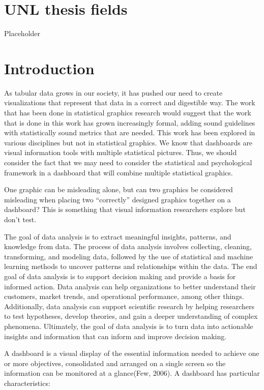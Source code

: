 \documentclass[print]{nuthesis}
\begin{document}
\hypertarget{unl-thesis-fields}{%
\chapter{UNL thesis fields}\label{unl-thesis-fields}}

Placeholder

\hypertarget{introduction}{%
\chapter{Introduction}\label{introduction}}

As tabular data grows in our society, it has pushed our need to create visualizations that represent that data in a correct and digestible way.
The work that has been done in statistical graphics research would suggest that the work that is done in this work has grown increasingly formal, adding sound guidelines with statistically sound metrics that are needed.
This work has been explored in various disciplines but not in statistical graphics.
We know that dashboards are visual information tools with multiple statistical pictures.
Thus, we should consider the fact that we may need to consider the statistical and psychological framework in a dashboard that will combine multiple statistical graphics.

One graphic can be misleading alone, but can two graphics be considered misleading when placing two ``correctly'' designed graphics together on a dashboard?
This is something that visual information researchers explore but don't test.

The goal of data analysis is to extract meaningful insights, patterns, and knowledge from data. The process of data analysis involves collecting, cleaning, transforming, and modeling data, followed by the use of statistical and machine learning methods to uncover patterns and relationships within the data. The end goal of data analysis is to support decision making and provide a basis for informed action. Data analysis can help organizations to better understand their customers, market trends, and operational performance, among other things. Additionally, data analysis can support scientific research by helping researchers to test hypotheses, develop theories, and gain a deeper understanding of complex phenomena. Ultimately, the goal of data analysis is to turn data into actionable insights and information that can inform and improve decision making.

A dashboard is a visual display of the essential information needed to achieve one or more objectives, consolidated and arranged on a single screen so the information can be monitored at a glance(Few, 2006). A dashboard has particular characteristics:
\end{document}
